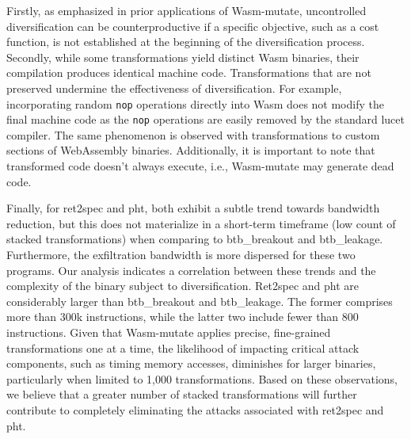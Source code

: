 \documentclass[sigplan,screen]{acmart}
\newcommand*\badge[1]{ \colorbox{red}{\color{white}#1}}
\newcommand{\tool}{Wasm-mutate\xspace}
\newcommand{\wasm}{Wasm\xspace}
\newcommand{\Wasm}{WebAssembly\xspace}
\newcommand{\todo}[1]{%
\refstepcounter{todo}
\noindent\textbf{\badge{TODO}} {\color{red}#1}
\addcontentsline{td}{todo}
{\color{red}\thesection.\thetodo\xspace #1}}
\begin{document}
Firstly, as emphasized in prior applications of \tool \cite{CABRERAARTEAGA2023103296}, uncontrolled diversification can be counterproductive if a specific objective, such as a cost function, is not established at the beginning of the diversification process.
Secondly, while some transformations yield distinct \wasm binaries, their compilation produces identical machine code.
Transformations that are not preserved undermine the effectiveness of diversification.
For example, incorporating random \texttt{nop} operations directly into \wasm does not modify the final machine code as the \texttt{nop} operations are easily removed by the standard lucet compiler.
The same phenomenon is observed with transformations to custom sections of \Wasm binaries.
Additionally, it is important to note that transformed code doesn't always execute, i.e., \tool may generate dead code.

Finally, for ret2spec and pht, both exhibit a subtle trend towards bandwidth reduction, but this does not materialize in a short-term timeframe (low count of stacked transformations) when comparing to btb\_breakout and btb\_leakage.
Furthermore,  the exfiltration bandwidth is more dispersed for these two programs.
Our analysis indicates a correlation between these trends and the complexity of the binary subject to diversification.
Ret2spec and pht are considerably larger than btb\_breakout and btb\_leakage.
The former comprises more than 300k instructions, while the latter two include fewer than 800 instructions.
Given that \tool applies precise, fine-grained transformations one at a time, the likelihood of impacting critical attack components, such as timing memory accesses, diminishes for larger binaries, particularly when limited to 1,000 transformations.
Based on these observations, we believe that a greater number of stacked transformations will further contribute to completely eliminating the attacks associated with ret2spec and pht.



\end{document}
